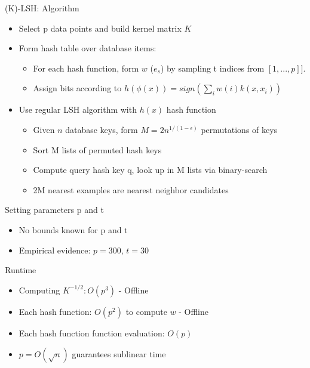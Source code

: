 \documentclass[12pt,a4paper]{beamer}
\begin{document}
\begin{frame}{(K)-LSH: Algorithm}
\begin{itemize}
\item Select p data points and build kernel matrix $K$
\item Form hash table over database items:
\begin{itemize}
\item For each hash function, form $w$ ($e_s$) by sampling t indices from $[1,...,p]]$.
\item Assign bits according to $h(\phi (x)) = sign (\sum_{i} w(i) k(x, x_{i}) )$
\end{itemize}
\item Use regular LSH algorithm with $h(x)$ hash function

    \begin{itemize}
    \item Given $n$ database keys, form $M=2n^{1/(1-\epsilon)}$ permutations of keys
    \item Sort M lists of permuted hash keys
    \item Compute query hash key q, look up in M lists via binary-search
    \item 2M nearest examples are nearest neighbor candidates
    \end{itemize}

\end{itemize}
\end{frame}

\begin{frame}{Setting parameters p and t}
\begin{itemize}
\item No bounds known for p and t
\item Empirical evidence: $p = 300$, $t = 30$
\end{itemize}
\end{frame}

\begin{frame}{Runtime}
\begin{itemize}
\item Computing $K^{-1/2}: O(p^{3})$ - Offline
\item Each hash function: $O(p^{2})$ to compute $w$ - Offline
\item Each hash function function evaluation: $O(p)$
\item $p = O(\sqrt{n})$ guarantees sublinear time
\end{itemize}
\end{frame}
\end{document}

